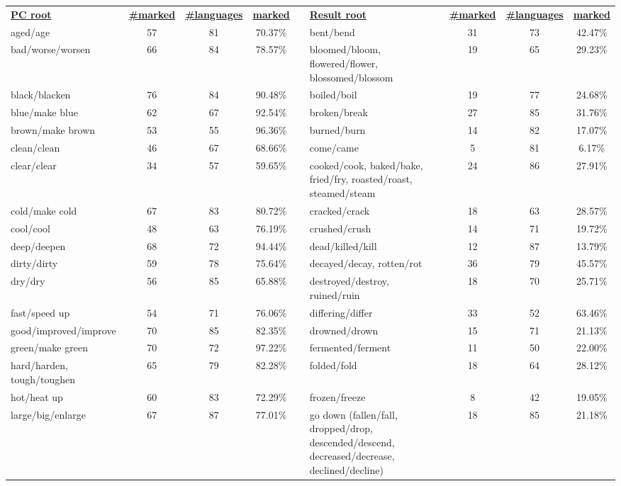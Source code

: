 \begin{tabular}{p{3cm}ccccp{3cm}ccc}
\underline{\textbf{PC root}} & \underline{\textbf{\#marked}} & \underline{\textbf{\#languages}} & \underline{\textbf{marked}} & & \underline{\textbf{Result root}} & \underline{\textbf{\#marked}} & \underline{\textbf{\#languages}} & \underline{\textbf{marked}} \\
aged/age & 57 & 81 & 70.37\% & & bent/bend & 31 & 73 & 42.47\% \\
bad/worse/worsen & 66 & 84 & 78.57\% & & bloomed/bloom, flowered/flower, blossomed/blossom & 19 & 65 & 29.23\% \\
black/blacken & 76 & 84 & 90.48\% & & boiled/boil & 19 & 77 & 24.68\% \\
blue/make blue & 62 & 67 & 92.54\% & & broken/break & 27 & 85 & 31.76\% \\
brown/make brown & 53 & 55 & 96.36\% & & burned/burn & 14 & 82 & 17.07\% \\
clean/clean & 46 & 67 & 68.66\% & & come/came & 5 & 81 & 6.17\% \\
clear/clear & 34 & 57 & 59.65\% & & cooked/cook, baked/bake, fried/fry, roasted/roast, steamed/steam & 24 & 86 & 27.91\% \\
cold/make cold & 67 & 83 & 80.72\% & & cracked/crack & 18 & 63 & 28.57\% \\
cool/cool & 48 & 63 & 76.19\% & & crushed/crush & 14 & 71 & 19.72\% \\
deep/deepen & 68 & 72 & 94.44\% & & dead/killed/kill & 12 & 87 & 13.79\% \\
dirty/dirty & 59 & 78 & 75.64\% & & decayed/decay, rotten/rot & 36 & 79 & 45.57\% \\
dry/dry & 56 & 85 & 65.88\% & & destroyed/destroy, ruined/ruin & 18 & 70 & 25.71\% \\
fast/speed up & 54 & 71 & 76.06\% & & differing/differ & 33 & 52 & 63.46\% \\
good/improved/improve & 70 & 85 & 82.35\% & & drowned/drown & 15 & 71 & 21.13\% \\
green/make green & 70 & 72 & 97.22\% & & fermented/ferment & 11 & 50 & 22.00\% \\
hard/harden, tough/toughen & 65 & 79 & 82.28\% & & folded/fold & 18 & 64 & 28.12\% \\
hot/heat up & 60 & 83 & 72.29\% & & frozen/freeze & 8 & 42 & 19.05\% \\
large/big/enlarge & 67 & 87 & 77.01\% & & go down (fallen/fall, dropped/drop, descended/descend, decreased/decrease, declined/decline) & 18 & 85 & 21.18\% \\

\end{tabular}

